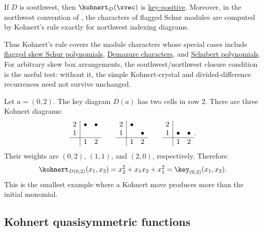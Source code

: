 \begin{theorem}
If \(D\) is southwest, then \(\kohnert_D(\xvec)\) is
\hyperref[key]{key-positive}.  Moreover, in the northwest convention of
\cite{ArmonAssafBowlingEhrhard2023}, the characters of flagged Schur modules
are computed by Kohnert's rule exactly for northwest indexing diagrams.
\end{theorem}
Thus Kohnert's rule covers the module characters whose special cases include
\hyperref[schurFlagged]{flagged skew Schur polynomials},
\hyperref[key]{Demazure characters},
and \hyperref[schubert]{Schubert polynomials}.  For arbitrary skew box
arrangements, the southwest/northwest closure condition is the useful test:
without it, the simple Kohnert-crystal and divided-difference recurrences need
not survive unchanged.

\begin{example*}
Let \(a=(0,2)\).  The key diagram \(D(a)\) has two cells in row \(2\).
There are three Kohnert diagrams:
\[
\begin{array}{c|cc}
  2 & \bullet & \bullet \\
  1 &         &         \\ \hline
    & 1 & 2
\end{array}
\qquad
\begin{array}{c|cc}
  2 & \bullet &         \\
  1 &         & \bullet \\ \hline
    & 1 & 2
\end{array}
\qquad
\begin{array}{c|cc}
  2 &         &         \\
  1 & \bullet & \bullet \\ \hline
    & 1 & 2
\end{array}.
\]
Their weights are \((0,2)\), \((1,1)\), and \((2,0)\), respectively.
Therefore
\[
 \kohnert_{D(0,2)}(x_1,x_2)
 = x_2^2+x_1x_2+x_1^2
 = \key_{(0,2)}(x_1,x_2).
\]
This is the smallest example where a Kohnert move produces more than the
initial monomial.
\end{example*}

\subsection[kohnertQuasi]{Kohnert quasisymmetric functions}

